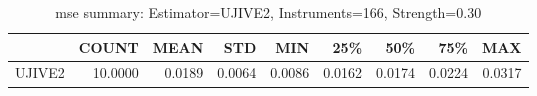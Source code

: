 \begin{table}[ht]
\centering
\caption{mse summary: Estimator=UJIVE2, Instruments=166, Strength=0.30}
\begin{tabular}{lrrrrrrrr}
\toprule
 & COUNT & MEAN & STD & MIN & 25\% & 50\% & 75\% & MAX \\
\midrule
UJIVE2 & 10.0000 & 0.0189 & 0.0064 & 0.0086 & 0.0162 & 0.0174 & 0.0224 & 0.0317 \\
\bottomrule
\end{tabular}
\end{table}
